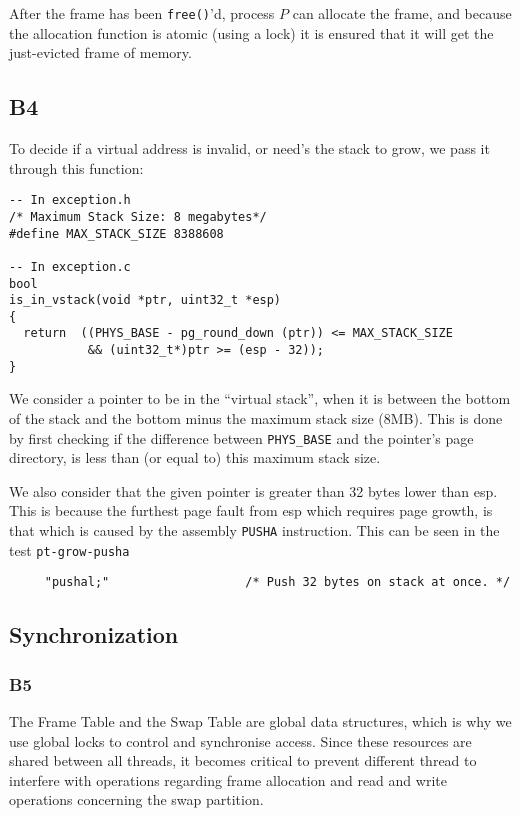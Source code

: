 \documentclass[a4wide, 11pt]{article}
\newcommand{\tx}{\texttt}
\begin{document}
After the frame has been \tx{free()}'d, process $P$ can allocate the frame, and because the allocation function is atomic (using a lock) it is ensured that it will get the just-evicted frame of memory.

\subsection{B4}

To decide if a virtual address is invalid, or need's the stack to grow, we pass it through this function:
\begin{verbatim}
-- In exception.h
/* Maximum Stack Size: 8 megabytes*/
#define MAX_STACK_SIZE 8388608

-- In exception.c
bool
is_in_vstack(void *ptr, uint32_t *esp)
{
  return  ((PHYS_BASE - pg_round_down (ptr)) <= MAX_STACK_SIZE
           && (uint32_t*)ptr >= (esp - 32));
}
\end{verbatim}

We consider a pointer to be in the ``virtual stack'', when it is between the bottom of the stack and the bottom minus the maximum stack size (8MB). This is done by first checking if the difference between \tx{PHYS\_BASE} and the pointer's page directory, is less than (or equal to) this maximum stack size.

We also consider that the given pointer is greater than 32 bytes lower than esp. This is because the furthest page fault from esp which requires page growth, is that which is caused by the assembly \tx{PUSHA} instruction. This can be seen in the test \tx{pt-grow-pusha}

\begin{verbatim}
     "pushal;"                   /* Push 32 bytes on stack at once. */
\end{verbatim}

\subsection{Synchronization}
\subsubsection{B5}

The Frame Table and the Swap Table are global data structures, which is why we use global locks to control and synchronise access. Since these resources are shared between all threads, it becomes critical to prevent different thread to interfere with operations regarding frame allocation and read and write operations concerning the swap partition.
\end{document}
